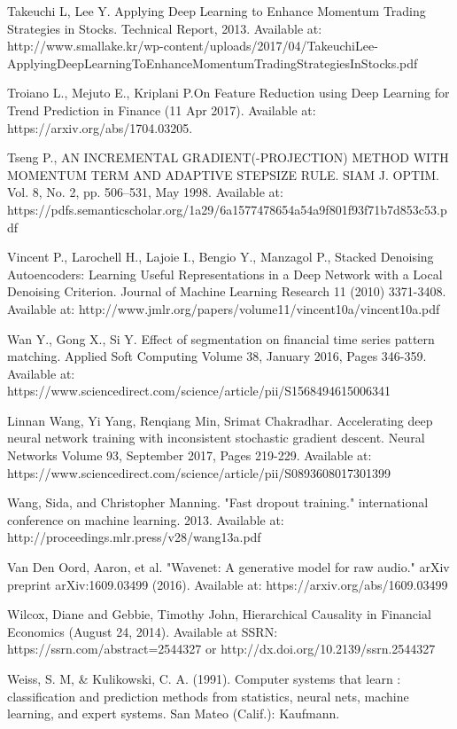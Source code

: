 \documentclass[a4paper,latin]{paper}
\begin{document}
\begin{thebibliography}{bibliography}
Takeuchi L, Lee Y. Applying Deep Learning to Enhance Momentum Trading Strategies in 
Stocks. Technical Report, 2013. Available at: http://www.smallake.kr/wp-content/uploads/2017/04/TakeuchiLee-ApplyingDeepLearningToEnhanceMomentumTradingStrategiesInStocks.pdf

Troiano L., Mejuto E., Kriplani P.On Feature Reduction using Deep Learning
for Trend Prediction in Finance (11 Apr 2017).  Available at: 
https://arxiv.org/abs/1704.03205.

Tseng P., AN INCREMENTAL GRADIENT(-PROJECTION) METHOD
WITH MOMENTUM TERM AND ADAPTIVE STEPSIZE RULE. SIAM J. OPTIM.  Vol. 8, No. 2, pp. 506–531, May 
1998. Available at: https://pdfs.semanticscholar.org/1a29/6a1577478654a54a9f801f93f71b7d853c53.pdf

Vincent P., Larochell H., Lajoie I., Bengio Y., Manzagol P., Stacked Denoising Autoencoders: Learning Useful Representations in
a Deep Network with a Local Denoising Criterion. Journal of Machine Learning Research 11 (2010) 
3371-3408. Available at: http://www.jmlr.org/papers/volume11/vincent10a/vincent10a.pdf

Wan Y., Gong X., Si Y. Effect of segmentation on financial time series pattern 
matching. Applied Soft Computing Volume 38, January 2016, Pages 346-359. 
Available at: https://www.sciencedirect.com/science/article/pii/S1568494615006341

Linnan Wang,  Yi Yang, Renqiang Min, Srimat Chakradhar. Accelerating deep neural network training with 
inconsistent stochastic gradient descent. Neural Networks
Volume 93, September 2017, Pages 219-229. Available at: https://www.sciencedirect.com/science/article/pii/S0893608017301399

Wang, Sida, and Christopher Manning. "Fast dropout training." international conference on machine learning. 2013.
Available at: http://proceedings.mlr.press/v28/wang13a.pdf

Van Den Oord, Aaron, et al. "Wavenet: A generative model for raw audio." arXiv preprint arXiv:1609.03499 (2016).
Available at: https://arxiv.org/abs/1609.03499

Wilcox, Diane and Gebbie, Timothy John, Hierarchical Causality in Financial Economics (August 24, 2014). Available at SSRN: https://ssrn.com/abstract=2544327 or http://dx.doi.org/10.2139/ssrn.2544327

Weiss, S. M, \& Kulikowski, C. A. (1991). Computer systems that learn : classification and prediction methods from statistics, neural nets, machine learning, and expert systems. San Mateo (Calif.): Kaufmann.


\end{thebibliography}
\end{document}
